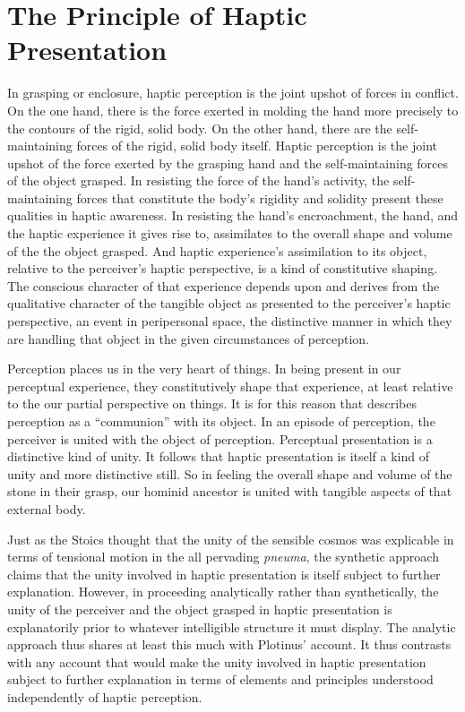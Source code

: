 

\section{The Principle of Haptic Presentation} %
\label{sec:sympathy_as_the_principle_of_haptic_presentation}

In grasping or enclosure, haptic perception is the joint upshot of forces in conflict. On the one hand, there is the force exerted in molding the hand more precisely to the contours of the rigid, solid body. On the other hand, there are the self-maintaining forces of the rigid, solid body itself. Haptic perception is the joint upshot of the force exerted by the grasping hand and the self-maintaining forces of the object grasped. In resisting the force of the hand's activity, the self-maintaining forces that constitute the body's rigidity and solidity present these qualities in haptic awareness. In resisting the hand's encroachment, the hand, and the haptic experience it gives rise to, assimilates to the overall shape and volume of the the object grasped. And haptic experience's assimilation to its object, relative to the perceiver's haptic perspective, is a kind of constitutive shaping. The conscious character of that experience depends upon and derives from the qualitative character of the tangible object as presented to the perceiver's haptic perspective, an event in peripersonal space, the distinctive manner in which they are handling that object in the given circumstances of perception.

Perception places us in the very heart of things. In being present in our perceptual experience, they constitutively shape that experience, at least relative to the our partial perspective on things. It is for this reason that \citet{Ardley:1958aa} describes perception as a ``communion'' with its object. In an episode of perception, the perceiver is united with the object of perception. Perceptual presentation is a distinctive kind of unity. It follows that haptic presentation is itself a kind of unity and more distinctive still. So in feeling the overall shape and volume of the stone in their grasp, our hominid ancestor is united with tangible aspects of that external body.

Just as the Stoics thought that the unity of the sensible cosmos was explicable in terms of tensional motion in the all pervading \emph{pneuma}, the synthetic approach claims that the unity involved in haptic presentation is itself subject to further explanation. However, in proceeding analytically rather than synthetically, the unity of the perceiver and the object grasped in haptic presentation is explanatorily prior to whatever intelligible structure it must display. The analytic approach thus shares at least this much with Plotinus' account. It thus contrasts with any account that would make the unity involved in haptic presentation subject to further explanation in terms of elements and principles understood independently of haptic perception. 

